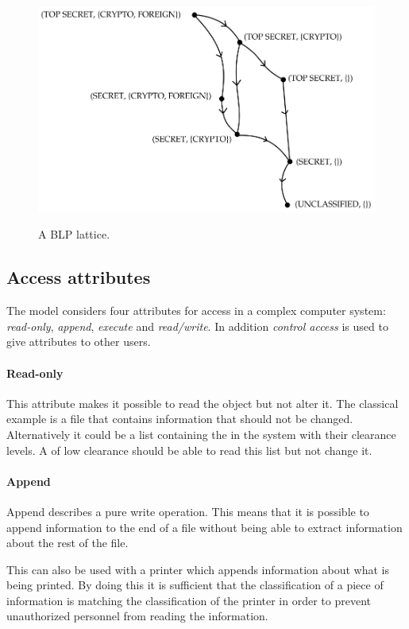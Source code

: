 \begin{figure}
\centering
\includegraphics[width=\textwidth]{figures/blp_lattice}
\label{blp:lattice}
\caption{A BLP lattice.}
\end{figure}

\subsection{Access attributes}
The model considers four attributes for access in a complex computer system: \emph{read-only}, \emph{append}, \emph{execute} and \emph{read/write}.
In addition \emph{control access} is used to give attributes to other users.

\paragraph{Read-only}
This attribute makes it possible to read the object but not alter it.
The classical example is a file that contains information that should not be changed.
Alternatively it could be a list containing the \principals{} in the system with their clearance levels.
A \principal{} of low clearance should be able to read this list but not change it.

\paragraph{Append}
Append describes a pure write operation.
This means that it is possible to append information to the end of a file without being able to extract information about the rest of the file.

This can also be used with a printer which appends information about what is being printed.
By doing this it is sufficient that the classification of a piece of information is matching the classification of the printer in order to prevent unauthorized personnel from reading the information.

